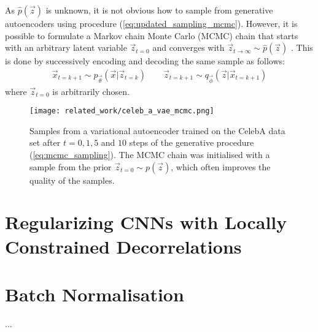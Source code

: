As $\hat{p}(\vec{z})$ is unknown, it is not obvious how to sample from generative autoencoders using procedure (\ref{eq:updated_sampling_mcmc}). However, it is possible to formulate a Markov chain Monte Carlo (MCMC) chain that starts with an arbitrary latent variable $\vec{z}_{t=0}$ and converges with $\vec{z}_{t \rightarrow \infty} \sim \hat{p}(\vec{z})$ \cite{Creswell2016}. This is done by successively encoding and decoding the same sample as follows:
\begin{align}
\vec{x}_{t=k+1} \sim p_{\vec{\theta}}(\vec{x} | \vec{z}_{t=k}) \quad\quad \vec{z}_{t=k+1} \sim q_{\vec{\phi}}(\vec{z} | \vec{x}_{t=k+1})
\label{eq:mcmc_sampling}
\end{align}
where $\vec{z}_{t=0}$ is arbitrarily chosen.

\begin{figure}[H]
\centering
\captionsetup{justification=centering}
\texttt{[image: related\_work/celeb\_a\_vae\_mcmc.png]}
\caption{Samples from a variational autoencoder trained on the CelebA data set after $t = 0, 1, 5$ and $10$ steps of the generative procedure (\ref{eq:mcmc_sampling}). The MCMC chain was initialised with a sample from the prior $\vec{z}_{t=0} \sim p(\vec{z})$, which often improves the quality of the samples. \cite{Creswell2016}}
\label{fig:mcmc_sampling}
\end{figure}



%
%
%
%
%
\section{Regularizing CNNs with Locally Constrained Decorrelations}
\cite{Rodriguez2016}




%
%
%
%
%
\section{Batch Normalisation}
...